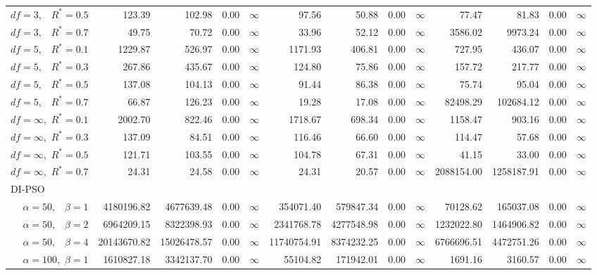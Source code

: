 \documentclass[cmbright]{staauth}
\begin{document}
\begin{table}[ht]
{\begin{tabular}{r|rrrr|rrrr|rrrr}
  $df = 3,\enspace$ $R^* =0.5$ & 123.39 & 102.98 & 0.00 & $\infty$ & 97.56 & 50.88 & 0.00 & $\infty$ & 77.47 & 81.83 & 0.00 & $\infty$ \\
  $df = 3,\enspace$ $R^* =0.7$ & 49.75 & 70.72 & 0.00 & $\infty$ & 33.96 & 52.12 & 0.00 & $\infty$ & 3586.02 & 9973.24 & 0.00 & $\infty$ \\
  $df = 5,\enspace$ $R^* =0.1$ & 1229.87 & 526.97 & 0.00 & $\infty$ & 1171.93 & 406.81 & 0.00 & $\infty$ & 727.95 & 436.07 & 0.00 & $\infty$ \\
  $df = 5,\enspace$ $R^* =0.3$ & 267.86 & 435.67 & 0.00 & $\infty$ & 124.80 & 75.86 & 0.00 & $\infty$ & 157.72 & 217.77 & 0.00 & $\infty$ \\
  $df = 5,\enspace$ $R^* =0.5$ & 137.08 & 104.13 & 0.00 & $\infty$ & 91.44 & 86.38 & 0.00 & $\infty$ & 75.74 & 95.04 & 0.00 & $\infty$ \\
  $df = 5,\enspace$ $R^* =0.7$ & 66.87 & 126.23 & 0.00 & $\infty$ & 19.28 & 17.08 & 0.00 & $\infty$ & 82498.29 & 102684.12 & 0.00 & $\infty$ \\
  $df = \infty,$ $R^* =0.1$ & 2002.70 & 822.46 & 0.00 & $\infty$ & 1718.67 & 698.34 & 0.00 & $\infty$ & 1158.47 & 903.16 & 0.00 & $\infty$ \\
  $df = \infty,$ $R^* =0.3$ & 137.09 & 84.51 & 0.00 & $\infty$ & 116.46 & 66.60 & 0.00 & $\infty$ & 114.47 & 57.68 & 0.00 & $\infty$ \\
  $df = \infty,$ $R^* =0.5$ & 121.71 & 103.55 & 0.00 & $\infty$ & 104.78 & 67.31 & 0.00 & $\infty$ & 41.15 & 33.00 & 0.00 & $\infty$ \\
  $df = \infty,$ $R^* =0.7$ & 24.31 & 24.58 & 0.00 & $\infty$ & 24.31 & 20.57 & 0.00 & $\infty$ & 2088154.00 & 1258187.91 & 0.00 & $\infty$ \\
\hline
\multicolumn{1}{l|}{DI-PSO} &&&&&&&&&&&&\\
  $\alpha = 50,\enspace$ $\beta =1$ & 4180196.82 & 4677639.48 & 0.00 & $\infty$ & 354071.40 & 579847.34 & 0.00 & $\infty$ & 70128.62 & 165037.08 & 0.00 & $\infty$ \\
  $\alpha = 50,\enspace$ $\beta =2$ & 6964209.15 & 8322398.93 & 0.00 & $\infty$ & 2341768.78 & 4277548.98 & 0.00 & $\infty$ & 1232022.80 & 1464906.82 & 0.00 & $\infty$ \\
  $\alpha = 50,\enspace$ $\beta =4$ & 20143670.82 & 15026478.57 & 0.00 & $\infty$ & 11740754.91 & 8374232.25 & 0.00 & $\infty$ & 6766696.51 & 4472751.26 & 0.00 & $\infty$ \\
  $\alpha = 100,$ $\beta =1$ & 1610827.18 & 3342137.70 & 0.00 & $\infty$ & 55104.82 & 171942.01 & 0.00 & $\infty$ & 1691.16 & 3160.57 & 0.00 & $\infty$ \\

\end{tabular}}
\end{table}
\end{document}
